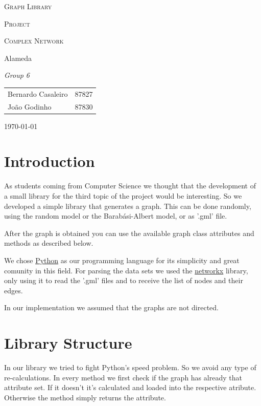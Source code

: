 \documentclass[a4paper,titlepage,11pt]{article}
\begin{document}
\begin{titlepage}
  \begin{center}
    {\scshape \huge Graph Library \par}
    \vspace{1cm}

    {\scshape \LARGE Project \par}
    \vspace{1.5cm}

    {\scshape \Large Complex Network \par}
    \vspace{0.5cm}

    {\Large Alameda \par}
    \vfill

    {\itshape \Large Group 6 \par}
    \vfill

    \begin{tabular}{l l}
      Bernardo Casaleiro & 87827\\
      João Godinho & 87830\\
    \end{tabular}
    \vfill

    {\large \today\par}
  \end{center}
\end{titlepage}

\section{Introduction}
As students coming from Computer Science we thought that the development of a small library for the third topic of the project would be interesting.
So we developed a simple library that generates a graph. This can be done randomly, using the random model or the Barabási-Albert model, or as '.gml' file.

After the graph is obtained you can use the available graph class attributes and methods as described below.

We chose \href{https://www.python.org}{Python} as our programming language for its simplicity and great comunity in this field.
For parsing the data sets we used the \href{https://networkx.github.io}{networkx} library, only using it to read the  '.gml' files and to receive the list of nodes and their edges.

In our implementation we assumed that the graphs are not directed.

\section{Library Structure}
In our library we tried to fight Python's speed problem. So we avoid any type of re-calculations.
In every method we first check if the graph has already that attribute set.
If it doesn't it's calculated and loaded into the respective atribute. Otherwise the method simply returns the attribute.
\end{document}

